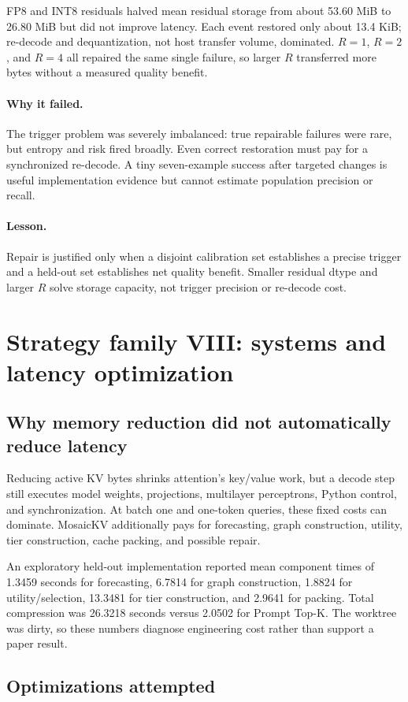 \documentclass[11pt]{article}
\newcommand{\lesson}{\paragraph{Lesson.}}
\newcommand{\failure}{\paragraph{Why it failed.}}
\begin{document}
FP8 and INT8 residuals halved mean residual storage from about 53.60 MiB to 26.80 MiB but did not
improve latency.  Each event restored only about 13.4 KiB; re-decode and dequantization, not host
transfer volume, dominated.  $R=1$, $R=2$, and $R=4$ all repaired the same single failure, so larger
$R$ transferred more bytes without a measured quality benefit.

\failure
The trigger problem was severely imbalanced: true repairable failures were rare, but entropy and
risk fired broadly.  Even correct restoration must pay for a synchronized re-decode.  A tiny
seven-example success after targeted changes is useful implementation evidence but cannot estimate
population precision or recall.

\lesson
Repair is justified only when a disjoint calibration set establishes a precise trigger and a
held-out set establishes net quality benefit.  Smaller residual dtype and larger $R$ solve storage
capacity, not trigger precision or re-decode cost.

\section{Strategy family VIII: systems and latency optimization}

\subsection{Why memory reduction did not automatically reduce latency}

Reducing active KV bytes shrinks attention's key/value work, but a decode step still executes model
weights, projections, multilayer perceptrons, Python control, and synchronization.  At batch one
and one-token queries, these fixed costs can dominate.  MosaicKV additionally pays for forecasting,
graph construction, utility, tier construction, cache packing, and possible repair.

An exploratory held-out implementation reported mean component times of 1.3459 seconds for
forecasting, 6.7814 for graph construction, 1.8824 for utility/selection, 13.3481 for tier
construction, and 2.9641 for packing.  Total compression was 26.3218 seconds versus 2.0502 for
Prompt Top-K.  The worktree was dirty, so these numbers diagnose engineering cost rather than
support a paper result.

\subsection{Optimizations attempted}
\end{document}
